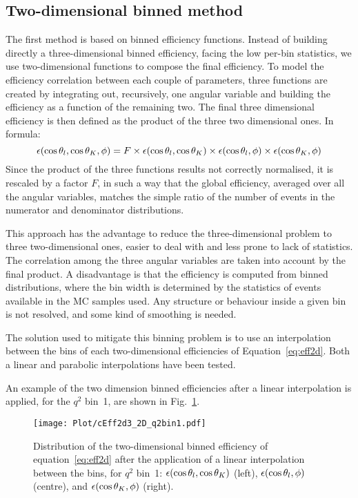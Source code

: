 \subsection{Two-dimensional binned method}\label{sec:eff_2Dprod}
The first method is based on binned efficiency functions.
Instead of building directly a three-dimensional binned efficiency, facing the low per-bin statistics, we use two-dimensional functions to compose the final efficiency.
To model the efficiency correlation between each couple of parameters, three functions are created by integrating out, recursively, one angular variable and building the efficiency as a function of the remaining two.
The final three dimensional efficiency is then defined as the product of the three two dimensional ones.
In formula:
\begin{equation}\label{eq:eff2d}
    \epsilon(\cos\theta_l,\cos\theta_K,\phi)=F\times\epsilon(\cos\theta_l,\cos\theta_K)\times\epsilon(\cos\theta_l,\phi)\times\epsilon(\cos\theta_K,\phi)
\end{equation}
Since the product of the three functions results not correctly normalised, it is rescaled by a factor $F$, in such a way that the global efficiency, averaged over all the angular variables, matches the simple ratio of the number of events in the numerator and denominator distributions.

This approach has the advantage to reduce the three-dimensional problem to three two-dimensional ones, easier to deal with and less prone to lack of statistics.
The correlation among the three angular variables are taken into account by the final product.
A disadvantage is that the efficiency is computed from binned distributions, where the bin width is determined by the statistics of events available in the MC samples used.
Any structure or behaviour inside a given bin is not resolved, and some kind of smoothing is needed.

The solution used to mitigate this binning problem is to use an interpolation between the bins of each two-dimensional efficiencies of Equation~\ref{eq:eff2d}.
Both a linear and parabolic interpolations have been tested.

An example of the two dimension binned efficiencies after a linear interpolation is applied, for the $q^2$ bin~1, are shown in Fig.~\ref{fig:eff2D}.

\begin{figure}[hbt]
    \texttt{[image: Plot/cEff2d3\_2D\_q2bin1.pdf]}
    \caption{Distribution of the two-dimensional binned efficiency of equation~\ref{eq:eff2d} after the application of a linear interpolation between the bins, for $q^2$ bin~1: $\epsilon(\cos\theta_l,\cos\theta_K)$ (left), $\epsilon(\cos\theta_l,\phi)$ (centre), and $\epsilon(\cos\theta_K,\phi)$ (right).}
    \label{fig:eff2D}
\end{figure}

